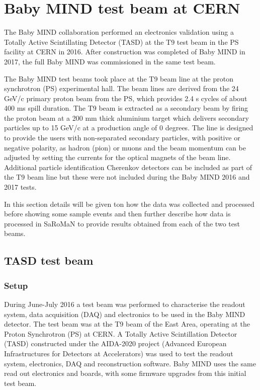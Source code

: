 \chapter{Baby MIND test beam at CERN}
\label{c:Testbeam}

The Baby MIND collaboration performed an electronics validation using a Totally Active Scintillating Detector (TASD) at the T9 test beam in the PS facility at CERN in 2016. After construction was completed of Baby MIND in 2017, the full Baby MIND was commissioned in the same test beam.

The Baby MIND test beams took place at the T9 beam line at the proton synchrotron (PS) experimental hall. The beam lines are derived from the 24 GeV/c primary proton beam from the PS, which provides 2.4 s cycles of about 400 ms spill duration. The T9 beam is extracted as a secondary beam by firing the proton beam at a 200 mm thick aluminium target which delivers secondary particles up to 15 GeV/c at a production angle of 0 degrees. The line is designed to provide the users with non-separated secondary particles, with positive or negative polarity, as hadron (pion) or muons and the beam momentum can be adjusted by setting the currents for the optical magnets of the beam line. Additional particle identification Cherenkov detectors can be included as part of the T9 beam line but these were not included during the Baby MIND 2016 and 2017 tests.

In this section details will be given ton how the data was collected and processed before showing some sample events and then further describe how data is processed in SaRoMaN to provide results obtained from each of the two test beams.


\section{TASD test beam}

\subsection{Setup}
During June-July 2016 a test beam was performed to characterise the readout system, data acquisition (DAQ) and electronics to be used in the Baby MIND detector. The test beam was at the T9 beam of the East Area, operating at the Proton Synchrotron (PS) at CERN. A Totally Active Scintillation Detector (TASD) constructed under the AIDA-2020 project (Advanced European Infrastructures for Detectors at Accelerators) was used to test the readout system, electronics, DAQ and reconstruction software. Baby MIND uses the same read out electronics and boards, with some firmware upgrades from this initial test beam.

